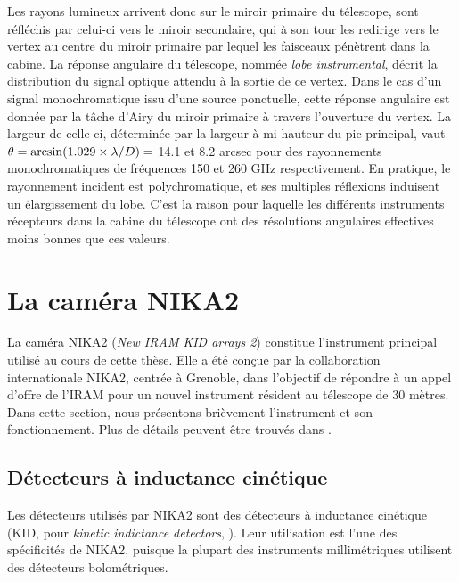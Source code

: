 Les rayons lumineux arrivent donc sur le miroir primaire du télescope, sont réfléchis par celui-ci vers le miroir secondaire, qui à son tour les redirige vers le vertex au centre du miroir primaire par lequel les faisceaux pénètrent dans la cabine.
La réponse angulaire du télescope, nommée \textit{lobe instrumental}, décrit la distribution du signal optique attendu à la sortie de ce vertex.
Dans le cas d'un signal monochromatique issu d'une source ponctuelle, cette réponse angulaire est donnée par la tâche d'Airy du miroir primaire à travers l'ouverture du vertex.
La largeur de celle-ci, déterminée par la largeur à mi-hauteur du pic principal, vaut $\theta = {\rm arcsin}(1.029 \times \lambda / D) =$ 14.1 et 8.2 arcsec pour des rayonnements monochromatiques de fréquences 150 et 260 GHz respectivement.
En pratique, le rayonnement incident est polychromatique, et ses multiples réflexions induisent un élargissement du lobe.
C'est la raison pour laquelle les différents instruments récepteurs dans la cabine du télescope ont des résolutions angulaires effectives moins bonnes que ces valeurs.

\section{La caméra NIKA2}

La caméra NIKA2 (\textit{New IRAM KID arrays 2}) constitue l'instrument principal utilisé au cours de cette thèse.
Elle a été conçue par la collaboration internationale NIKA2, centrée à Grenoble, dans l'objectif de répondre à un appel d'offre de l'IRAM pour un nouvel instrument résident au télescope de 30 mètres.
Dans cette section, nous présentons brièvement l'instrument et son fonctionnement.
Plus de détails peuvent être trouvés dans \cite{adam_nika2_2018,perotto_calibration_2020}.
\subsection{Détecteurs à inductance cinétique}\label{sec:kids}

Les détecteurs utilisés par NIKA2 sont des détecteurs à inductance cinétique (KID, pour \textit{kinetic indictance detectors}, \cite{day_broadband_2003,roesch_development_2012}).
Leur utilisation est l'une des spécificités de NIKA2, puisque la plupart des instruments millimétriques utilisent des détecteurs bolométriques.

